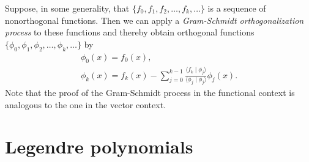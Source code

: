 Suppose, in some generality,
that
 $\{f_0,f_1,f_2,\ldots ,f_k,\ldots \}$
is a sequence of nonorthogonal functions.
Then we can apply a {\em Gram-Schmidt orthogonalization process} to these functions
and thereby obtain orthogonal functions
$\{\phi_0,\phi_1,\phi_2,\ldots ,\phi_k,\ldots \}$
by
\begin{equation}
\begin{split}
\phi_0 (x) =f_0(x), \\
\phi_k (x)
=
f_k(x)
-
\sum_{j=0}^{k-1}\frac{\langle f_k\mid \phi_j \rangle}{\langle \phi_j   \mid \phi_j \rangle}\phi_j (x).
\end{split}
\label{2011-m-ch-sfegs}
\end{equation}
Note that the proof of the {  Gram-Schmidt  process} in the functional
context is analogous to the one in the vector context.

\section{Legendre polynomials}
\label{2013-m-sf-lp}

